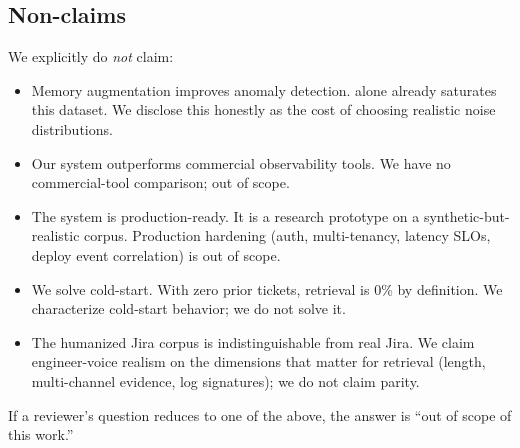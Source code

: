 \subsection{Non-claims}

We explicitly do \emph{not} claim:

\begin{itemize}
\item Memory augmentation improves anomaly detection. \hgb{} alone already saturates this dataset. We disclose this honestly as the cost of choosing realistic noise distributions.
\item Our system outperforms commercial observability tools. We have no commercial-tool comparison; out of scope.
\item The system is production-ready. It is a research prototype on a synthetic-but-realistic corpus. Production hardening (auth, multi-tenancy, latency SLOs, deploy event correlation) is out of scope.
\item We solve cold-start. With zero prior tickets, retrieval is $0\%$ by definition. We characterize cold-start behavior; we do not solve it.
\item The humanized Jira corpus is indistinguishable from real Jira. We claim engineer-voice realism on the dimensions that matter for retrieval (length, multi-channel evidence, log signatures); we do not claim parity.
\end{itemize}

If a reviewer's question reduces to one of the above, the answer is ``out of scope of this work.''
